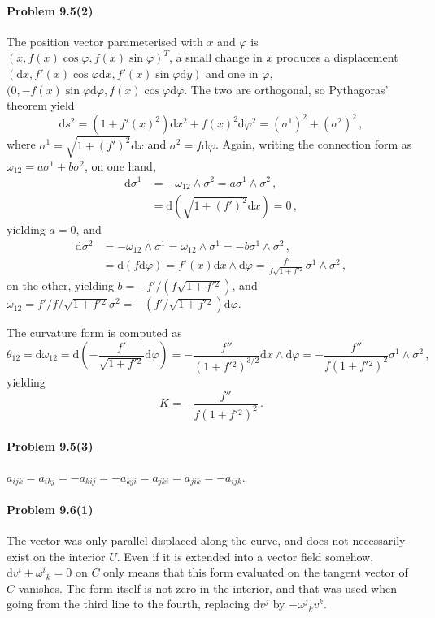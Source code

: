 \documentclass[a4paper,12pt]{article}
\def\d{\mathrm{d}}
\newcommand{\problem}[1]{\paragraph{Problem #1}}
\begin{document}
\problem{9.5(2)} \hspace{-.6ex}The position vector parameterised with $x$ and $\varphi$ is $(x, f(x)\cos\varphi, f(x)\sin\varphi)^T$, a small change in $x$ produces a displacement
$(\d x, f'(x)\cos\varphi \d x, f'(x)\sin\varphi\d y)$ and one in $\varphi$, $(0, -f(x)\sin\varphi \d\varphi, f(x)\cos\varphi\d\varphi$. The two are orthogonal, so Pythagoras' theorem yield
\[
 \d s^2 = (1+f'(x)^2)\d x^2 + f(x)^2 \d \varphi^2=(\sigma^1)^2 + (\sigma^2)^2\,,
\]
where $\sigma^1=\sqrt{1+(f')^2}\d x$ and $\sigma^2 = f \d\varphi$. Again, writing the connection form as $\omega_{12} = a\sigma^1 + b \sigma^2$, on one hand,
\[
 \begin{aligned}
  \d \sigma^1 &= -\omega_{12}\wedge \sigma^2 = a \sigma^1\wedge\sigma^2\,,\\
  &= \d (\sqrt{1+(f')^2} \d x) = 0\,,
 \end{aligned}
\]
yielding $a=0$, and
\[
 \begin{aligned}
  \d \sigma^2 &= -\omega_{12}\wedge \sigma^1 = \omega_{12}\wedge\sigma^1 = -b \sigma^1\wedge\sigma^2\,,\\
  &= \d (f \d \varphi) = f'(x) \d x \wedge \d \varphi = \frac{f'}{f\sqrt{1+f'{}^2}}\sigma^1\wedge\sigma^2\,,
 \end{aligned}
\]
on the other, yielding $b = -f'/(f\sqrt{1+f'{}^2})$,
and $\omega_{12} = f'/f/\sqrt{1+f'{}^2} \sigma^2 = -(f'/\sqrt{1+f'{}^2})\d \varphi$.

The curvature form is computed as
\[
 \theta_{12} = \d\omega_{12} = \d\left(-\frac{f'}{\sqrt{1+f'{}^2}}\d\varphi\right) = -\frac{f''}{(1+f'{}^2)^{3/2}}\d x\wedge \d\varphi = -\frac{f''}{f(1+f'{}^2)^2}\sigma^1\wedge\sigma^2\,,
\]
yielding
\[
 K = -\frac{f''}{f(1+f'{}^2)^2}\,.
\]


\problem{9.5(3)} $a_{ijk} = a_{ikj} = -a_{kij} = -a_{kji} = a_{jki} = a_{jik} = -a_{ijk}$.


\problem{9.6(1)} The vector was only parallel displaced along the curve, and does not necessarily exist on the interior $U$. Even if it is extended into a vector field somehow,  $\d v^i + \omega^i{}_k =0$ on $C$ only means that this form evaluated on the tangent vector of $C$ vanishes. The form itself is not zero in the interior, and that was used when going from the third line to the fourth, replacing $\d v^j$ by $-\omega^j{}_k v^k$.
\end{document}
